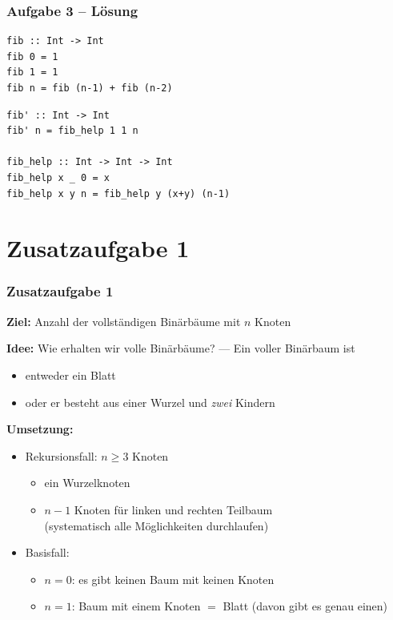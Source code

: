 \documentclass{beamer}
\begin{document}
	\begin{frame}[fragile] \frametitle{Aufgabe 3 -- Lösung}
		\begin{lstlisting}[style=bg]
fib :: Int -> Int
fib 0 = 1
fib 1 = 1
fib n = fib (n-1) + fib (n-2)
		\end{lstlisting}
	
		\begin{lstlisting}[style=bg]
fib' :: Int -> Int
fib' n = fib_help 1 1 n

fib_help :: Int -> Int -> Int
fib_help x _ 0 = x
fib_help x y n = fib_help y (x+y) (n-1)
		\end{lstlisting}
	\end{frame}

	\section{Zusatzaufgabe 1}
	
	\begin{frame} \frametitle{Zusatzaufgabe 1}
		\footnotesize
		\textbf{Ziel:} Anzahl der vollständigen Binärbäume mit $n$ Knoten
		
		\textbf{Idee:} Wie erhalten wir volle Binärbäume? --- Ein voller Binärbaum ist
		\begin{itemize}
			\item entweder ein Blatt
			\item oder er besteht aus einer Wurzel und \textit{zwei} Kindern 
		\end{itemize}
		
		\textbf{Umsetzung:}  
		\begin{itemize}
			\item Rekursionsfall: $n \ge 3$ Knoten 
			\begin{itemize} \footnotesize
				\item ein Wurzelknoten
				\item $n-1$ Knoten für linken und rechten Teilbaum \\ (systematisch alle Möglichkeiten durchlaufen)
			\end{itemize}
			\item Basisfall: 
			\begin{itemize} \footnotesize
				\item $n = 0$: es gibt keinen Baum mit keinen Knoten
				\item $n = 1$: Baum mit einem Knoten $=$ Blatt (davon gibt es genau einen)
			\end{itemize}
		\end{itemize}
	\end{frame}
	
\end{document}
